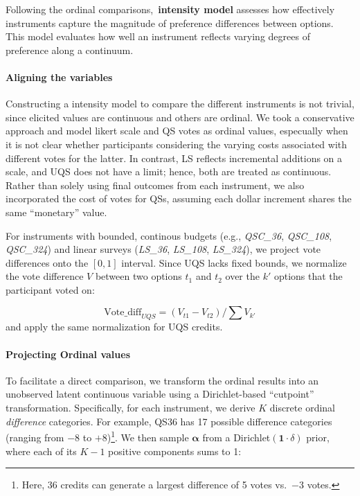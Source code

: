 Following the ordinal comparisons,~\textbf{intensity model} assesses how effectively instruments capture the magnitude of preference differences between options. This model evaluates how well an instrument reflects varying degrees of preference along a continuum.

\paragraph{Aligning the variables} Constructing a intensity model to compare the different instruments is not trivial, since elicited values are continuous and others are ordinal. We took a conservative approach and model likert scale and QS votes as ordinal values, especually when it is not clear whether participants considering the varying costs associated with different votes for the latter. In contrast, LS reflects incremental additions on a scale, and UQS does not have a limit; hence, both are treated as continuous. Rather than solely using final outcomes from each instrument, we also incorporated the cost of votes for QSs, assuming each dollar increment shares the same ``monetary'' value.

For instruments with bounded, continous budgets (e.g., \textit{QSC\_36}, \textit{QSC\_108}, \textit{QSC\_324}) and linear surveys (\textit{LS\_36}, \textit{LS\_108}, \textit{LS\_324}), we project vote differences onto the $[0,1]$ interval. Since UQS lacks fixed bounds, we normalize the vote difference $V$ between two options $t_1$ and $t_2$ over the $k'$ options that the participant voted on:

\begin{equation}
    \text{Vote\_diff}_{UQS} 
    = (V_{t1} - V_{t2})/\textstyle\sum V_{k'}
\end{equation}
and apply the same normalization for UQS credits.

\paragraph{Projecting Ordinal values} 
To facilitate a direct comparison, we transform the ordinal results into an unobserved latent continuous variable using a Dirichlet-based ``cutpoint'' transformation. Specifically, for each instrument, we derive $K$ discrete ordinal \emph{difference} categories. For example, QS36 has 17 possible difference categories (ranging from $-8$ to $+8$)\footnote{Here, 36 credits can generate a largest difference of 5 votes vs.\ $-3$ votes.}. We then sample
\(\boldsymbol{\alpha}\) from a Dirichlet$(\mathbf{1}\cdot\delta)$ prior, where each of its $K-1$ positive components sums to 1:

